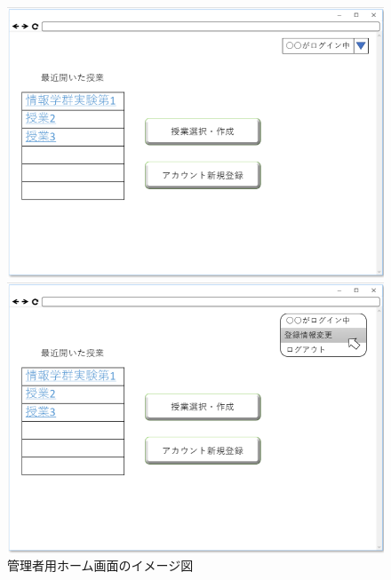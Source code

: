 \begin{figure}[htbp]
 \begin{minipage}{0.5\hsize}
  \begin{center}
   \includegraphics[width=1\linewidth,clip]{./img/04.png}
  \end{center}

 \end{minipage}
 \begin{minipage}{0.5\hsize}
  \begin{center}
   \includegraphics[width=1\linewidth,clip]{./img/05.png}
  \end{center}
 \end{minipage}
 \caption{管理者用ホーム画面のイメージ図}\label{fig:04}
\end{figure}

